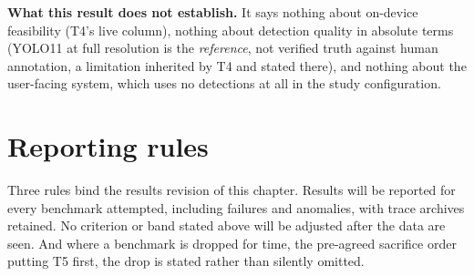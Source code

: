 \textbf{What this result does not establish.} It says nothing about on-device feasibility (T4's live
column), nothing about detection quality in absolute terms (YOLO11 at full resolution is the
\textit{reference}, not verified truth against human annotation, a limitation inherited by T4 and stated
there), and nothing about the user-facing system, which uses no detections at all in the study
configuration.

\section{Reporting rules}

Three rules bind the results revision of this chapter. Results will be reported for every benchmark
attempted, including failures and anomalies, with trace archives retained. No criterion or band
stated above will be adjusted after the data are seen. And where a benchmark is dropped for time,
the pre-agreed sacrifice order putting T5 first, the drop is stated rather than silently omitted.
